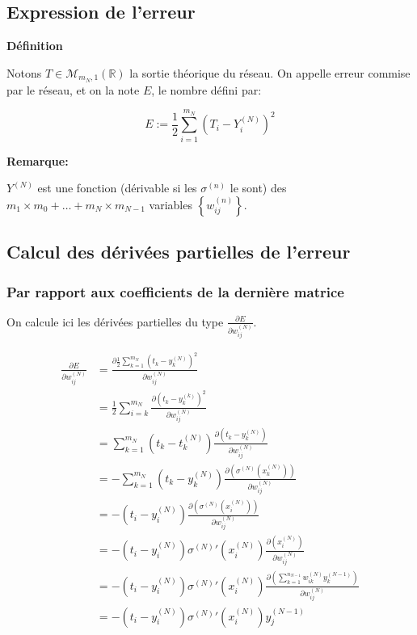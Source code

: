 \documentclass[11pt]{article}
\begin{document}
\subsection{Expression de l'erreur}
\label{sec-4-2}

\textbf{Définition}

Notons $T\in\mathcal{M}_{m_{N},1}(\mathbb{R})$ la sortie théorique du réseau. On
appelle erreur commise par le réseau, et on la note $E$, le nombre défini par:

\begin{equation}
E:=\frac{1}{2}\sum_{i=1}^{m_{N}}(T_{i}-Y_{i}^{(N)})^{2}
\end{equation}

\textbf{Remarque:}

$Y^{(N)}$ est une fonction (dérivable si les $\sigma^{(n)}$ le sont) des
$m_{1}\times m_{0}+\dots+m_{N}\times m_{N-1}$ variables
$\left\{w_{ij}^{(n)}\right\}$.

\subsection{Calcul des dérivées partielles de l'erreur}
\label{sec-4-3}

\subsubsection{Par rapport aux coefficients de la dernière matrice}
\label{sec-4-3-1}

On calcule ici les dérivées partielles du type
$\frac{\partial E}{\partial w_{ij}^{(N)}}$.

\begin{align}
\frac{\partial E}{\partial w_{ij}^{(N)}}
& = \frac{\partial \frac{1}{2}\sum_{k=1}^{m_{N}}
(t_{k}-y_{k}^{(N)})^{2}}{\partial w_{ij}^{(N)}}\\
& = \frac{1}{2}\sum_{i=k}^{m_{N}}
\frac{\partial (t_{k}-y_{k}^{(k)})^{2}}{\partial w_{ij}^{(N)}}\\
& = \sum_{k=1}^{m_{N}}(t_{k}-t_{k}^{(N)})
\frac{\partial (t_{k}-y_{k}^{(N)})}{\partial w_{ij}^{(N)}}\\
& = -\sum_{k=1}^{m_{N}}(t_{k}-y_{k}^{(N)})
\frac{\partial (\sigma^{(N)}(x_{k}^{(N)}))}{\partial w_{ij}^{(N)}}\\
& = -(t_{i}-y_{i}^{(N)})
\frac{\partial (\sigma^{(N)}(x_{i}^{(N)}))}{\partial w_{ij}^{(N)}}\\
& = -(t_{i}-y_{i}^{(N)})\sigma^{(N)}'(x_{i}^{(N)})
\frac{\partial (x_{i}^{(N)})}{\partial w_{ij}^{(N)}}\\
& = -(t_{i}-y_{i}^{(N)})\sigma^{(N)}'(x_{i}^{(N)})
\frac{\partial (\sum_{k=1}^{n_{N-1}}w_{ik}^{(N)}y_{k}^{(N-1)})}
{\partial w_{ij}^{(N)}}\\
& = -(t_{i}-y_{i}^{(N)})\sigma^{(N)}'(x_{i}^{(N)})y_{j}^{(N-1)}\\
\end{align}
\end{document}
